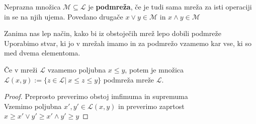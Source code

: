 \documentclass[slovene]{beamer}
\begin{document}
\begin{frame}
\begin{definition}
Neprazna množica $\mathcal{M} \subseteq \mathcal{L}$ je \textbf{podmreža}, če je tudi sama mreža za isti operaciji in se na njih ujema. Povedano drugače $x \lor y \in \mathcal{M}$ in $x \land y \in \mathcal{M}$
\end{definition}
\end{frame}

\begin{frame}
\begin{block}{}
Zanima nas lep način, kako bi iz obstoječih mrež lepo dobili podmreže\\ \pause
Uporabimo stvar, ki jo v mrežah imamo in za podmrežo vzamemo kar vse, ki so med dvema elementoma.
\end{block}
\end{frame}

\begin{frame}
\begin{theorem}
Če v mreži $\mathcal{L}$ vzamemo poljubna $x \leq y$, potem je množica $\mathcal{L}(x,y) := \{ z \in \mathcal{L} | \ x \leq z \leq y \}$ podmreža mreže $\mathcal{L}$.
\end{theorem}

\begin{proof}
Preprosto preverimo obstoj imfimuma in supremuma\\ \pause
Vzemimo poljubna $x',y' \in \mathcal{L}(x,y)$ in preverimo zaprtost\\ \pause $x \geq x' \lor y' \geq x' \land y' \geq y$
\end{proof}

\end{frame}
\end{document}
